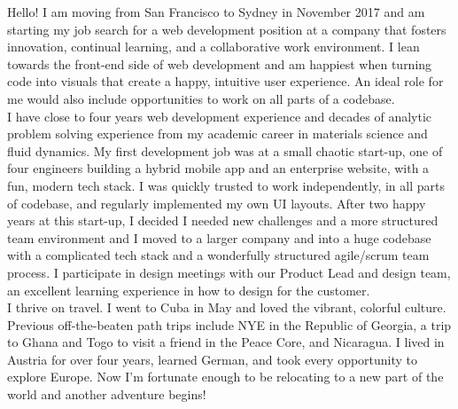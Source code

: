 \documentclass[11pt, a4paper]{awesome-cv}
\begin{document}
\makecvheader

\makelettertitle

\begin{cvletter}
\raggedright
\vspace{-10pt}
Hello! I am moving from San Francisco to Sydney in November 2017 and am starting my job search for a 
web development position at a company that fosters innovation, continual learning, and a collaborative work environment.  I lean towards the front-end side of web development and am happiest when turning code into visuals that create a happy, intuitive user experience. An ideal role for me would also include opportunities to work on all parts of a codebase.
\vspace{6pt}
\\
I have close to four years web development experience and decades of analytic problem solving experience from my academic career in materials science and fluid dynamics. 
My first development job was at a small chaotic start-up, one of four engineers building a hybrid mobile app and an enterprise website, with a fun, modern tech stack. I was quickly trusted to work independently, in all parts of codebase, and regularly implemented my own UI layouts.  After two happy years at this start-up, I decided I needed new challenges and a more structured team environment and I moved to a larger company and into a huge codebase with a complicated tech stack and a wonderfully structured agile/scrum team process.  I participate in design meetings with our Product Lead and design team, an excellent learning experience in how to design for the customer.  
\vspace{6pt}
\\
I thrive on travel. I went to Cuba in May and loved the vibrant, colorful culture. Previous off-the-beaten path trips include NYE in the Republic of Georgia, a trip to Ghana and Togo to visit a friend in the Peace Core, and Nicaragua. I lived in Austria for over four years, learned German, and took every opportunity to explore Europe.  Now I'm fortunate enough to be relocating to a new part of the world and another adventure begins!


\end{cvletter}
\end{document}
